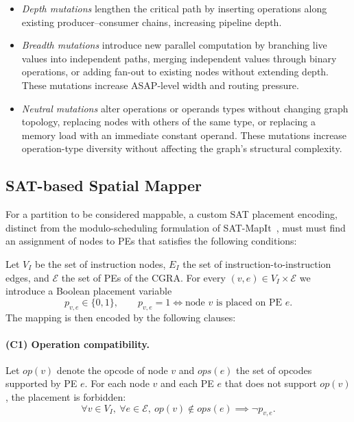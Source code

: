\documentclass[runningheads]{llncs}
\begin{document}
\begin{itemize}
  \item \emph{Depth mutations} lengthen the critical path by inserting %
  operations along existing producer--consumer chains, increasing pipeline depth.

  \item \emph{Breadth mutations} introduce new parallel computation by branching live values into independent paths, merging independent values through binary operations, or adding fan-out to existing nodes without extending depth. These mutations increase ASAP-level width and routing pressure.

  \item \emph{Neutral mutations} alter 
  operations or operands types without changing graph topology, 
  replacing nodes with others of the same type, or replacing a 
  memory load with an immediate constant operand. These mutations increase operation-type diversity without affecting the graph's structural complexity.
\end{itemize}

\subsection{SAT-based Spatial Mapper}\label{subsec:sat-mapping}

For a partition to be considered mappable, a custom SAT placement encoding, distinct from the modulo-scheduling formulation of SAT-MapIt~\cite{tirelli2023sat}, must must find an assignment of nodes to PEs that satisfies the following conditions:

Let $V_I$ be the set of instruction nodes, $E_I$ the set of instruction-to-instruction edges, and $\mathcal{E}$ the set of PEs of the CGRA. For every $(v,e) \in V_I \times \mathcal{E}$ we introduce a Boolean placement variable
\[
	p_{v,e} \in \{0,1\}, \qquad p_{v,e} = 1 \iff \text{node } v
	\text{ is placed on PE } e.
\]
The mapping is then encoded by the following clauses:

\paragraph{(C1) Operation compatibility.}
Let $\mathit{op}(v)$ denote the opcode of node $v$ and $\mathit{ops}(e)$ the set of opcodes supported by PE $e$. For each node $v$ and each PE $e$ that does not support $\mathit{op}(v)$, the placement is forbidden:
\begin{equation}
    \forall v \in V_I,\ \forall e \in \mathcal{E},\
    \mathit{op}(v) \notin \mathit{ops}(e) \implies \neg p_{v,e}.
\end{equation}
\end{document}
